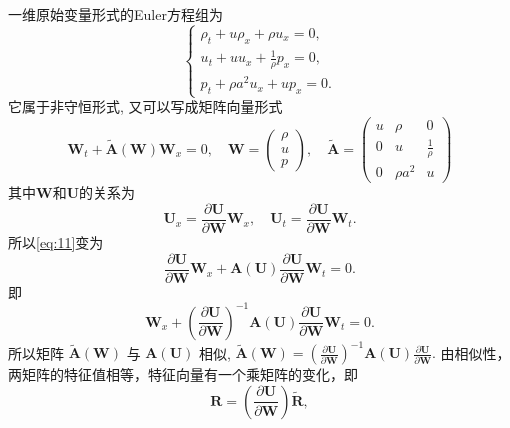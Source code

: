 \documentclass[12pt]{article}
\begin{document}
一维原始变量形式的Euler方程组为
\begin{equation}
	\begin{cases}
		\rho_{t}+u \rho_{x}+\rho u_{x}=0,\\
		u_{t}+u u_{x}+\frac{1}{\rho} p_{x}=0,\\
		p_{t}+\rho a^{2} u_{x}+u p_{x}=0.	
	\end{cases}
\end{equation}
它属于非守恒形式, 又可以写成矩阵向量形式
\begin{equation}
	\boldsymbol{W}_{t}+\widetilde{\boldsymbol{A}}(\boldsymbol{W}) \boldsymbol{W}_{x}=0, \quad \boldsymbol{W}=\left(\begin{array}{l}
	\rho \\
	u \\
	p
	\end{array}\right), \quad \widetilde{\boldsymbol{A}}=\left(\begin{array}{ccc}
	u & \rho & 0 \\
	0 & u & \frac{1}{\rho} \\
	0 & \rho a^{2} & u
	\end{array}\right)
\end{equation}
其中$\bm{W}$和$\bm{U}$的关系为
\begin{equation}
	\bm{U}_x = \frac{\partial \bm{U}}{\partial \bm{W}} \bm{W}_x,\quad  \bm{U}_t = \frac{\partial \bm{U}}{\partial \bm{W}} \bm{W}_t.
\end{equation}
所以\cref{eq:11}变为
\begin{equation}
	\frac{\partial \bm{U}}{\partial \bm{W}} \bm{W}_x + \boldsymbol{A}(\boldsymbol{U}) \frac{\partial \bm{U}}{\partial \bm{W}} \bm{W}_t =0.
\end{equation}
即
\begin{equation}
	\bm{W}_x + \left(\frac{\partial \boldsymbol{U}}{\partial \boldsymbol{W}}\right)^{-1} \boldsymbol{A}(\boldsymbol{U}) \frac{\partial \bm{U}}{\partial \bm{W}} \bm{W}_t =0.
\end{equation}
所以矩阵 $\widetilde{\boldsymbol{A}}(\boldsymbol{W})$ 与 $\boldsymbol{A}(\boldsymbol{U})$ 相似, $\widetilde{\boldsymbol{A}}(\boldsymbol{W})=\left(\frac{\partial \boldsymbol{U}}{\partial \boldsymbol{W}}\right)^{-1} \boldsymbol{A}(\boldsymbol{U}) \frac{\partial \boldsymbol{U}}{\partial \boldsymbol{W}}.$
由相似性，两矩阵的特征值相等，特征向量有一个乘矩阵的变化，即
\begin{equation}
	\bm{R} = \left(\frac{\partial \boldsymbol{U}}{\partial \boldsymbol{W}}\right) \widetilde{\bm{R}},
\end{equation}
\end{document}
